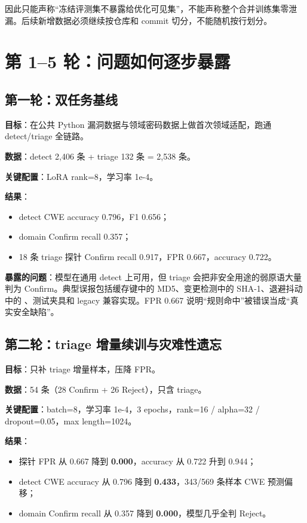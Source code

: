 \documentclass[UTF8,11pt,fontset=none]{ctexart}
\newcommand{\code}[1]{\texttt{\detokenize{#1}}}
\begin{document}
因此只能声称“冻结评测集不暴露给优化可见集”，不能声称整个合并训练集零泄漏。后续新增数据必须继续按仓库和 commit 切分，不能随机按行划分。

\section{第 1--5 轮：问题如何逐步暴露}

\subsection{第一轮：双任务基线}

\textbf{目标}：在公共 Python 漏洞数据与领域密码数据上做首次领域适配，跑通 detect/triage 全链路。

\textbf{数据}：detect 2,406 条 + triage 132 条 = 2,538 条。

\textbf{关键配置}：LoRA rank=8，学习率 1e-4。

\textbf{结果}：

\begin{itemize}
  \item detect CWE accuracy 0.796，F1 0.656；
  \item domain Confirm recall 0.357；
  \item 18 条 triage 探针 Confirm recall 0.917，FPR 0.667，accuracy 0.722。
\end{itemize}

\textbf{暴露的问题}：模型在通用 detect 上可用，但 triage 会把非安全用途的弱原语大量判为 Confirm。典型误报包括缓存键中的 MD5、变更检测中的 SHA-1、退避抖动中的 \code{random}、测试夹具和 legacy 兼容实现。FPR 0.667 说明“规则命中”被错误当成“真实安全缺陷”。

\subsection{第二轮：triage 增量续训与灾难性遗忘}

\textbf{目标}：只补 triage 增量样本，压降 FPR。

\textbf{数据}：54 条（28 Confirm + 26 Reject），只含 triage。

\textbf{关键配置}：batch=8，学习率 1e-4，3 epochs，rank=16 / alpha=32 / dropout=0.05，max length=1024。

\textbf{结果}：

\begin{itemize}
  \item 探针 FPR 从 0.667 降到 \textbf{0.000}，accuracy 从 0.722 升到 0.944；
  \item detect CWE accuracy 从 0.796 降到 \textbf{0.433}，343/569 条样本 CWE 预测偏移；
  \item domain Confirm recall 从 0.357 降到 \textbf{0.000}，模型几乎全判 Reject。
\end{itemize}
\end{document}
